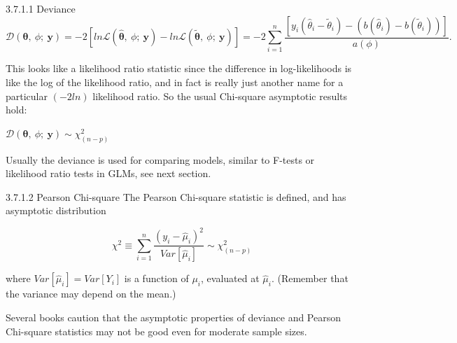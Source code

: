 \documentclass[
  9pt,
  ignorenonframetext,
]{beamer}
\begin{document}
\begin{frame}{}
\protect\hypertarget{section-6}{}
\begin{block}{3.7.1.1 Deviance}
\protect\hypertarget{deviance-1}{}
\[
\mathcal D(\pmb \theta,\ \phi;\ \pmb y)=-2[ln \mathcal L(\pmb {\hat \theta},\ \phi;\ \pmb y) - ln \mathcal L(\pmb {\tilde \theta},\ \phi;\ \pmb y)] = -2\sum_{i=1}^n \frac {[y_i ({ \hat \theta} _i- \tilde \theta_i)-(b(\hat \theta_i)-b(\tilde \theta _i))]} {a(\phi)}.
\]

This looks like a likelihood ratio statistic since the difference in
log-likelihoods is like the log of the likelihood ratio, and in fact is
really just another name for a particular \((-2ln)\) likelihood ratio.
So the usual Chi-square asymptotic results hold:

\(\mathcal D(\pmb \theta,\ \phi;\ \pmb y) \sim \chi_{(n-p)}^2\)

Usually the deviance is used for comparing models, similar to F-tests or
likelihood ratio tests in GLMs, see next section.
\end{block}
\end{frame}

\begin{frame}{}
\protect\hypertarget{section-7}{}
\begin{block}{3.7.1.2 Pearson Chi-square}
\protect\hypertarget{pearson-chi-square}{}
The Pearson Chi-square statistic is defined, and has asymptotic
distribution

\[
\chi^2 \equiv \sum_{i=1}^n \frac {(y_i- \hat \mu_i )^2} {Var[\hat \mu_i]} \sim \chi_{(n-p)}^2
\]

where \(Var[\hat \mu_i]=Var[Y_i]\) is a function of \(\mu_i\), evaluated
at \(\hat \mu_i\). (Remember that the variance may depend on the mean.)

Several books caution that the asymptotic properties of deviance and
Pearson Chi-square statistics may not be good even for moderate sample
sizes.
\end{block}
\end{frame}
\end{document}
